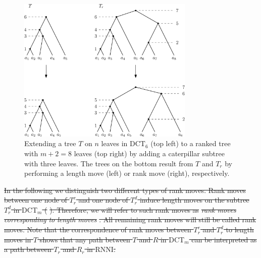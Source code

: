 \documentclass[11pt]{amsart}
\newcommand{\rnni}{\mathrm{RNNI}}
\newcommand{\dtt}{\mathrm{DCT}}
\newcommand{\dct}{\mathrm{DCT}} %
\newcommand{\summary}[1]{} %
\providecommand{\DIFaddtex}[1]{{\protect\color{blue}\uwave{#1}}} %
\providecommand{\DIFdeltex}[1]{{\protect\color{red}\sout{#1}}}                      %
\providecommand{\DIFdelbegin}{} %
\providecommand{\DIFdelend}{} %
\providecommand{\DIFaddFL}[1]{\DIFadd{#1}} %
\providecommand{\DIFdelFL}[1]{\DIFdel{#1}} %
\providecommand{\DIFaddbeginFL}{} %
\providecommand{\DIFaddendFL}{} %
\providecommand{\DIFdelbeginFL}{} %
\providecommand{\DIFdelendFL}{} %
\providecommand{\DIFadd}[1]{\texorpdfstring{\DIFaddtex{#1}}{#1}} %
\providecommand{\DIFdel}[1]{\texorpdfstring{\DIFdeltex{#1}}{}} %
\newcommand{\DIFscaledelfig}{0.5}
\newlength{\DIFdelgraphicswidth} %
\newlength{\DIFdelgraphicsheight} %
\newcommand{\DIFaddincludegraphics}[2][]{{\color{blue}\fbox{\DIFOincludegraphics[#1]{#2}}}} %
\newcommand{\DIFdelincludegraphics}[2][]{%
\sbox{\DIFdelgraphicsbox}{\DIFOincludegraphics[#1]{#2}}%
\settoboxwidth{\DIFdelgraphicswidth}{\DIFdelgraphicsbox} %
\settoboxtotalheight{\DIFdelgraphicsheight}{\DIFdelgraphicsbox} %
\scalebox{\DIFscaledelfig}{%
\parbox[b]{\DIFdelgraphicswidth}{\usebox{\DIFdelgraphicsbox}\\[-\baselineskip] \rule{\DIFdelgraphicswidth}{0em}}\llap{\resizebox{\DIFdelgraphicswidth}{\DIFdelgraphicsheight}{%
\setlength{\unitlength}{\DIFdelgraphicswidth}%
\begin{picture}(1,1)%
\thicklines\linethickness{2pt} %
{\color[rgb]{1,0,0}\put(0,0){\framebox(1,1){}}}%
{\color[rgb]{1,0,0}\put(0,0){\line( 1,1){1}}}%
{\color[rgb]{1,0,0}\put(0,1){\line(1,-1){1}}}%
\end{picture}%
}\hspace*{3pt}}} %
} %
\DeclareRobustCommand{\DIFdelbegin}{\DIFOdelbegin \let\includegraphics\DIFdelincludegraphics} %
\DeclareRobustCommand{\DIFdelend}{\DIFOaddend \let\includegraphics\DIFOincludegraphics} %
\DeclareRobustCommand{\DIFaddbeginFL}{\DIFOaddbeginFL \let\includegraphics\DIFaddincludegraphics} %
\DeclareRobustCommand{\DIFaddendFL}{\DIFOaddendFL \let\includegraphics\DIFOincludegraphics} %
\DeclareRobustCommand{\DIFdelbeginFL}{\DIFOdelbeginFL \let\includegraphics\DIFdelincludegraphics} %
\DeclareRobustCommand{\DIFdelendFL}{\DIFOaddendFL \let\includegraphics\DIFOincludegraphics} %
\begin{document}
\begin{figure}[ht]
	\includegraphics[width=0.75\textwidth]{dtt_to_ranked_tree.eps}
	\caption{Extending a tree $T$ on $n$ leaves in \DIFdelbeginFL \DIFdelFL{$\dtt_6$ }\DIFdelendFL \DIFaddbeginFL \DIFaddFL{$\dct_6$ }\DIFaddendFL (top left) to a ranked tree with $m+2=8$ leaves (top right) by adding a caterpillar subtree with three leaves.
	The trees on the bottom result from $T$ and $T_r$ by performing a length move (left) or rank move (right), respectively.}
	\label{fig:dtt_to_ranked_tree}
\end{figure}

\summary{Moves on the extended ranked versions of trees -- $\rnni$ vs length moves}
\DIFdelbegin \DIFdel{In the following we distinguish two different types of rank moves.
Rank moves between one node of $T_r^c$ and one node of $T_r^d$ induce length moves on the subtree $T_r^d$ in $\dtt_m$ (}%
\DIFdel{).
Therefore, we will refer to such rank moves as }\emph{\DIFdel{rank moves corresponding to length moves}}%
\DIFdel{.
All remaining rank moves will still be called rank moves.
Note that the correspondence of rank moves between $T_r^c$ and $T_r^d$ to length moves in $T$ shows that any path between $T$ and $R$ in $\dtt_m$ can be interpreted as a path between $T_r$ and $R_r$ in $\rnni$.
}\DIFdelend 
\end{document}
